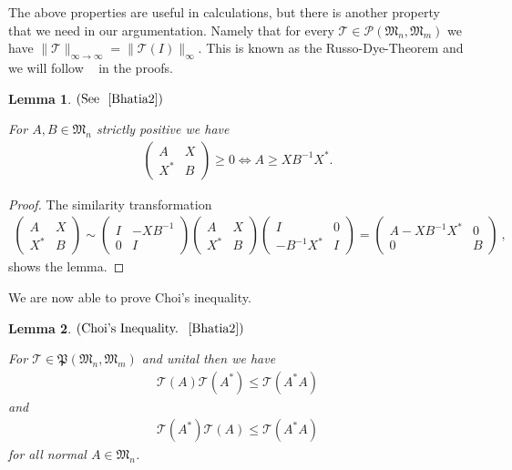 \documentclass[a4paper
               ,12pt
               ,DIV=12
               ,oneside
               ]
               {amsart}
\theoremstyle{plain}
\newtheorem{lem}{Lemma}
\theoremstyle{remark}
\def\ra{\rightarrow}
\def\lb{\left(}
\def\rb{\right)}
\newcommand\M{\mathfrak{M}}
\newcommand{\Tm}{\mathcal{T}}
\begin{document}
The above properties are useful in calculations, but there is another property that we need in our argumentation. Namely that for every $\Tm\in\mathcal{P}\lb \M_n,\M_m\rb$ we have $\| \Tm\|_{\infty\ra\infty}=\| \Tm\lb I\rb\|_{\infty}$. This is known as the Russo-Dye-Theorem and we will follow ~\cite{Bhatia2} in the proofs.

\begin{lem}$\lb\text{See ~\cite{Bhatia2}}\rb$

For $A,B\in\M_n$ strictly positive we have
\begin{align*}
\begin{pmatrix} A & X \\ X^{*} & B \end{pmatrix} \geq 0 \Longleftrightarrow A\geq XB^{-1}X^{*}.
\end{align*}
\label{lem:positivity}
\end{lem}

\begin{proof}

The similarity transformation 
\begin{align*}
\begin{pmatrix} A & X \\ X^{*} & B \end{pmatrix} \sim \begin{pmatrix} I & -XB^{-1} \\ 0 & I \end{pmatrix}\begin{pmatrix} A & X \\ X^{*} & B \end{pmatrix}\begin{pmatrix} I & 0 \\ -B^{-1}X^{*} & I \end{pmatrix}=\begin{pmatrix} A-XB^{-1}X^{*} & 0 \\ 0 & B \end{pmatrix}\medspace,
\end{align*}
shows the lemma.

\end{proof}

We are now able to prove Choi's inequality.

\begin{lem}$\lb\text{Choi's Inequality. ~\cite{Bhatia2}}\rb$

For $\Tm\in\mathfrak{P}\lb \M_n,\M_m\rb$ and unital then we have
\begin{align*}
\Tm\lb A\rb \Tm\lb A^{*}\rb \leq \Tm\lb A^{*}A\rb 
\end{align*} 
and
\begin{align*}
\Tm\lb A^{*}\rb\Tm\lb A\rb \leq \Tm\lb A^{*}A\rb 
\end{align*} 
for all normal $A\in\M_n$.
\label{lem:ChoiInequ}
\end{lem}
\end{document}
